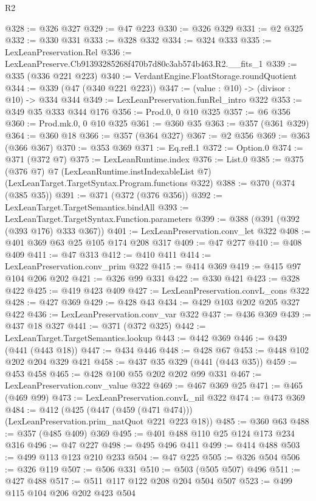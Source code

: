 \begin{lexlean}{R2}
\begin{coremodule}
@328 := @326 @327
@329 := @47 @223
@330 := @326 @329
@331 := @2 @325
@332 := @330 @331
@333 := @328 @332
@334 := @324 @333
@335 := LexLeanPreservation.Rel
@336 := LexLeanPreserve.Cb91393285268f470b7d80c3ab574b463.R2.__fits_1
@339 := @335 (@336 @221 @223)
@340 := VerdantEngine.FloatStorage.roundQuotient
@344 := @339 (@47 (@340 @221 @223))
@347 := (value : @10) -> (divisor : @10) -> @334 @344
@349 := LexLeanPreservation.funRel_intro @322
@353 := @349 @35 @333 @344 @176
@356 := Prod.{0, 0} @10 @325
@357 := @6 @356
@360 := Prod.mk.{0, 0} @10 @325
@361 := @360 @35
@363 := @357 (@361 @329)
@364 := @360 @18
@366 := @357 (@364 @327)
@367 := @2 @356
@369 := @363 (@366 @367)
@370 := @353 @369
@371 := Eq.refl.{1}
@372 := Option.{0}
@374 := @371 (@372 @7)
@375 := LexLeanRuntime.index
@376 := List.{0}
@385 := @375
    (@376 @7)
    @7
    (LexLeanRuntime.instIndexableList @7)
    (LexLeanTarget.TargetSyntax.Program.functions @322)
@388 := @370 (@374 (@385 @35))
@391 := @371 (@372 (@376 @356))
@392 := LexLeanTarget.TargetSemantics.bindAll
@393 := LexLeanTarget.TargetSyntax.Function.parameters
@399 := @388 (@391 (@392 (@393 @176) @333 @367))
@401 := LexLeanPreservation.conv_let @322
@408 := @401 @369 @63 @25 @105 @174 @208 @317
@409 := @47 @277
@410 := @408 @409
@411 := @47 @313
@412 := @410 @411
@414 := LexLeanPreservation.conv_prim @322
@415 := @414 @369
@419 := @415 @97 @104 @206 @202
@421 := @326 @99 @331
@422 := @330 @421
@423 := @328 @422
@425 := @419 @423 @409
@427 := LexLeanPreservation.convL_cons @322
@428 := @427 @369
@429 := @428 @43
@434 := @429 @103 @202 @205 @327 @422
@436 := LexLeanPreservation.conv_var @322
@437 := @436 @369
@439 := @437 @18 @327
@441 := @371 (@372 @325)
@442 := LexLeanTarget.TargetSemantics.lookup
@443 := @442 @369
@446 := @439 (@441 (@443 @18))
@447 := @434 @446
@448 := @428 @67
@453 := @448 @102 @202 @204 @329 @421
@458 := @437 @35 @329 (@441 (@443 @35))
@459 := @453 @458
@465 := @428 @100 @55 @202 @202 @99 @331
@467 := LexLeanPreservation.conv_value @322
@469 := @467 @369 @25
@471 := @465 (@469 @99)
@473 := LexLeanPreservation.convL_nil @322
@474 := @473 @369
@484 := @412 (@425 (@447 (@459 (@471 @474))) (LexLeanPreservation.prim_natQuot @221 @223 @18))
@485 := @360 @63
@488 := @357 (@485 @409) @369
@495 := @401 @488 @110 @25 @124 @173 @234 @316
@496 := @47 @227
@498 := @495 @496 @411
@499 := @414 @488
@503 := @499 @113 @123 @210 @233
@504 := @47 @225
@505 := @326 @504
@506 := @326 @119
@507 := @506 @331
@510 := @503 (@505 @507) @496
@511 := @427 @488
@517 := @511 @117 @122 @208 @204 @504 @507
@523 := @499 @115 @104 @206 @202 @423 @504

\end{coremodule}
\end{lexlean}
